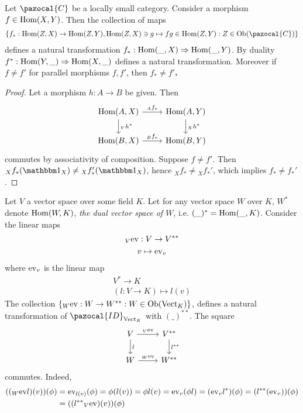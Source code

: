 \begin{lemma}\label{PreCompositionIsANaturalTransformationAndThisAssignmentIsInjective}
    Let $\pazocal{C}$ be a locally small category. Consider a morphism $f\in \mathrm{Hom}(X,Y)$. Then the collection of maps
    \begin{gather*}
        \{ f_\ast : \Hom(Z,X)\rightarrow \Hom(Z,Y), \Hom(Z,X)\ni g \mapsto fg \in \Hom(Z,Y) : Z\in \Ob(\pazocal{C})\}
    \end{gather*}
    defines a natural transformation $f_\ast : \mathrm{Hom}(\_,X)\Rightarrow \mathrm{Hom}(\_,Y)$. By duality $f^\ast : \mathrm{Hom}(Y,\_)\Rightarrow \mathrm{Hom}(X,\_)$ defines a natural transformation. Moreover if $f\neq f'$ for parallel morphisms $f,f'$, then $f_\ast \neq f'_\ast$
\end{lemma}
\begin{proof}
    Let a morphism $h : A\rightarrow B$ be given. Then
    $$
        \begin{tikzcd}
            \Hom(A,X)\arrow[r,"_Af_\ast"]\arrow[d,"{_Y}h^\ast"] & \Hom(A,Y)\arrow[d,"{_X}h^\ast"]\\
            \Hom(B,X) \arrow[r,"{_B}f_\ast"] & \Hom(B,Y)
        \end{tikzcd}
    $$
    commutes by associativity of composition. Suppose $f\neq f'$. Then ${_X}f_\ast(\fone_X) \neq {_X}f_\ast'(\fone_X)$, hence ${_X}f_\ast\neq {_X}f_\ast'$, which implies $f_\ast \neq f_\ast'$.
\end{proof}
\begin{example}
    Let $V$ a vector space over some field $K$. Let for any vector space $W$ over $K$, $W^\ast$ denote $\mathrm{Hom}(W,K)$, \emph{the dual vector space of $W$}, i.e. $(\_)^\ast= \mathrm{Hom}(\_,K)$.
    Consider the linear maps 
    \begin{gather*}
        {_V}\mathrm{ev}: V \rightarrow V^{\ast\ast}\\
        v \mapsto \mathrm{ev}_v
    \end{gather*}
    where $\mathrm{ev}_v$ is the linear map
    \begin{gather*}
        V^\ast \rightarrow K\\
        (l: V\rightarrow K)\mapsto l(v)
    \end{gather*}
    The collection $\{{_W}\mathrm{ev} : W\rightarrow W^{\ast\ast} : W\in\mathrm{Ob}(\mathrm{Vect}_K)\}$, defines a natural transformation of $\pazocal{ID}_{\mathrm{Vect}_K}$ with  $(\_)^{\ast\ast}$. The square 
    $$
        \begin{tikzcd}
            V \arrow[r,"{_V}\ev"] \arrow[d,"l"] &V^{\ast\ast}\arrow[d,"l^{\ast\ast}"]\\
            W \arrow[r,"{_W}\ev"] & W^{\ast\ast}
        \end{tikzcd}
    $$
    commutes. Indeed, 
    \begin{align*}
        (({_W}\mathrm{ev} l)(v))(\phi) &= \mathrm{ev}_{l(v)}(\phi) = \phi(l(v))= \phi l(v)=\mathrm{ev}_v(\phi l)=(\mathrm{ev}_vl^\ast)(\phi)=(l^{\ast\ast}(\mathrm{ev}_v))(\phi)\\ 
        &=((l^{\ast\ast}{_V}\mathrm{ev})(v))(\phi) 
    \end{align*}
\end{example}
